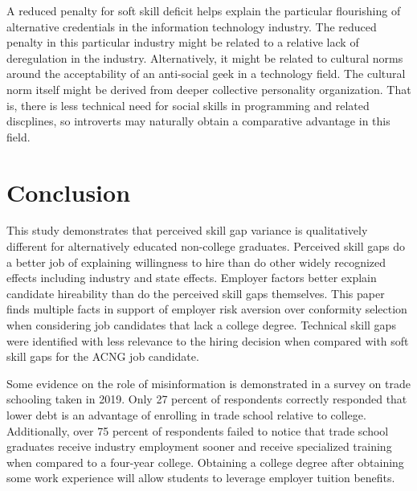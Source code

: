 \documentclass[review]{elsarticle}
\begin{document}
A reduced penalty for soft skill deficit helps explain the particular flourishing of alternative credentials in the information technology industry.
The reduced penalty in this particular industry might be related to a relative lack of deregulation in the industry.
Alternatively, it might be related to cultural norms around the acceptability of an anti-social geek in a technology field.
The cultural norm itself might be derived from deeper collective personality organization.
That is, there is less technical need for social skills in programming and related discplines, so introverts may naturally obtain a comparative advantage in this field.

\section{Conclusion}

This study demonstrates that perceived skill gap variance is qualitatively different for alternatively educated non-college graduates.
Perceived skill gaps do a better job of explaining willingness to hire than do other widely recognized effects including industry and state effects.
Employer factors better explain candidate hireability than do the perceived skill gaps themselves.
This paper finds multiple facts in support of employer risk aversion over conformity selection when considering job candidates that lack a college degree.
Technical skill gaps were identified with less relevance to the hiring decision when compared with soft skill gaps for the ACNG job candidate.

Some evidence on the role of misinformation is demonstrated in a survey on trade schooling taken in 2019\cite{arabia_2019}.
Only 27 percent of respondents correctly responded that lower debt is an advantage of enrolling in trade school relative to college.
Additionally, over 75 percent of respondents failed to notice that trade school graduates receive industry employment sooner
and receive specialized training when compared to a four-year college.
Obtaining a college degree after obtaining some work experience will allow students to leverage employer tuition benefits.
\end{document}
